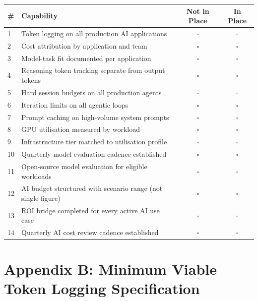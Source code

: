 \documentclass[11pt,twocolumn]{article}
\begin{document}
\vspace{6pt}
\begin{tabular}{lp{9cm}cc}
\toprule
\textbf{\#} & \textbf{Capability} & \textbf{Not in Place} & \textbf{In Place} \\
\midrule
1  & Token logging on all production AI applications              & $\square$ & $\square$ \\
2  & Cost attribution by application and team                     & $\square$ & $\square$ \\
3  & Model-task fit documented per application                    & $\square$ & $\square$ \\
4  & Reasoning token tracking separate from output tokens         & $\square$ & $\square$ \\
5  & Hard session budgets on all production agents                & $\square$ & $\square$ \\
6  & Iteration limits on all agentic loops                        & $\square$ & $\square$ \\
7  & Prompt caching on high-volume system prompts                 & $\square$ & $\square$ \\
8  & GPU utilisation measured by workload                         & $\square$ & $\square$ \\
9  & Infrastructure tier matched to utilisation profile           & $\square$ & $\square$ \\
10 & Quarterly model evaluation cadence established               & $\square$ & $\square$ \\
11 & Open-source model evaluation for eligible workloads          & $\square$ & $\square$ \\
12 & AI budget structured with scenario range (not single figure) & $\square$ & $\square$ \\
13 & ROI bridge completed for every active AI use case            & $\square$ & $\square$ \\
14 & Quarterly AI cost review cadence established                 & $\square$ & $\square$ \\
\bottomrule
\end{tabular}

\vspace{12pt}
\section*{Appendix B: Minimum Viable Token Logging Specification}
\label{app:logging}
\end{document}
